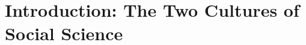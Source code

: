 \documentclass[hidelinks,11pt,a4paper]{report}
\begin{document}
\chapter{Introduction: The Two Cultures of Social Science}
\setcounter{page}{1}

\end{document}
